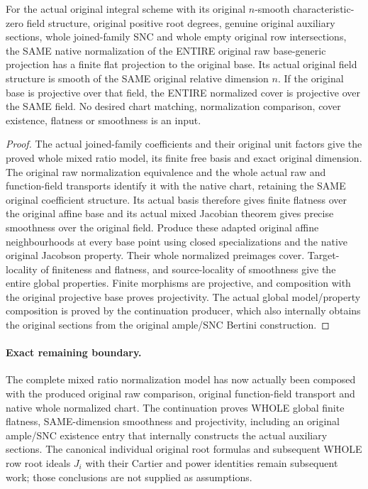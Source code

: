 \begin{lemma}
\label{lem:kn-nadel-global-normalized-geometric-properties}
\leanok
{}
For the actual original integral scheme with its original $n$-smooth
characteristic-zero field structure, original positive root degrees, genuine
original auxiliary sections, whole joined-family SNC and whole empty original
row intersections, the SAME native normalization of the ENTIRE original raw
base-generic projection has a finite flat projection to the original base.
Its actual original field structure is smooth of the SAME original relative
dimension $n$. If the original base is projective over that field, the ENTIRE
normalized cover is projective over the SAME field. No desired chart matching,
normalization comparison, cover existence, flatness or smoothness is an input.
\end{lemma}
\begin{proof}
The actual joined-family coefficients and their original unit factors give
the proved whole mixed ratio model, its finite free basis and exact original
dimension. The original raw normalization equivalence and the whole actual
raw and function-field transports identify it with the native chart, retaining
the SAME original coefficient structure. Its actual basis therefore gives
finite flatness over the original affine base and its actual mixed Jacobian theorem
gives precise smoothness over the original field. Produce these adapted
original affine neighbourhoods at every base point using closed
specializations and the native original Jacobson property. Their whole
normalized preimages cover. Target-locality of finiteness and flatness, and source-locality
of smoothness give the entire global properties. Finite morphisms are
projective, and composition with the original projective base proves
projectivity. The actual global model/property composition is proved by the
continuation producer, which also internally obtains the original sections
from the original ample/SNC Bertini construction.
\end{proof}

\paragraph{Exact remaining boundary.}
The complete mixed ratio normalization model has now actually been composed
with the produced original raw comparison, original function-field transport
and native whole normalized chart. The continuation proves WHOLE global finite
flatness, SAME-dimension smoothness and projectivity, including an original
ample/SNC existence entry that internally constructs the actual auxiliary
sections. The canonical individual original root formulas and subsequent
WHOLE row root ideals $J_i$ with their Cartier and power identities remain
subsequent work; those conclusions are not supplied as assumptions.
